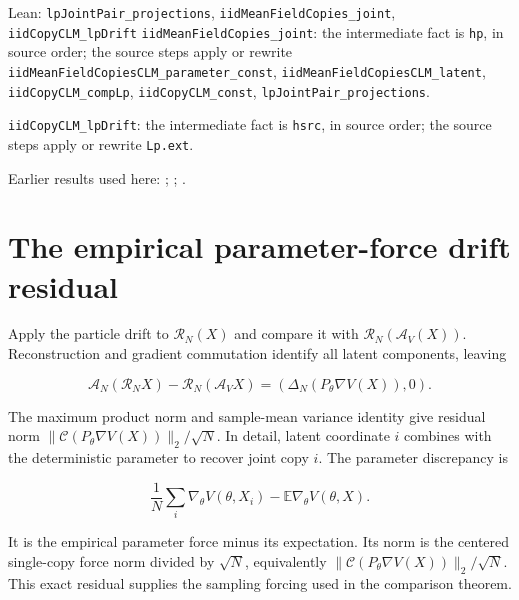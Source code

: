 \documentclass[11pt,a4paper]{article}
\begin{document}
\begin{leanbox}{Lean: \texttt{lpJointPair\_\allowbreak{}projections}, \texttt{iidMeanFieldCopies\_\allowbreak{}joint}, \texttt{iidCopyCLM\_\allowbreak{}lpDrift}}
\texttt{iid\allowbreak{}Mean\allowbreak{}Field\allowbreak{}Copies\_\allowbreak{}joint}: the intermediate fact is \texttt{hp}, in source order; the source steps apply or rewrite \texttt{iid\allowbreak{}Mean\allowbreak{}Field\allowbreak{}Copies\allowbreak{}CLM\_\allowbreak{}parameter\_\allowbreak{}const}, \texttt{iid\allowbreak{}Mean\allowbreak{}Field\allowbreak{}Copies\allowbreak{}CLM\_\allowbreak{}latent}, \texttt{iid\allowbreak{}Copy\allowbreak{}CLM\_\allowbreak{}comp\allowbreak{}Lp}, \texttt{iid\allowbreak{}Copy\allowbreak{}CLM\_\allowbreak{}const}, \texttt{lp\allowbreak{}Joint\allowbreak{}Pair\_\allowbreak{}projections}.



\texttt{iid\allowbreak{}Copy\allowbreak{}CLM\_\allowbreak{}lp\allowbreak{}Drift}: the intermediate fact is \texttt{hsrc}, in source order; the source steps apply or rewrite \texttt{Lp.\allowbreak{}ext}.
\end{leanbox}


Earlier results used here: \cite[Section~3.13.2]{LangevinLean2026ULASC}; \cite[Section~3.13.3]{LangevinLean2026ULASC}; \cite[Section~3.1.1]{LangevinLean2026IPLA}.

\section{\texorpdfstring{The empirical parameter-force drift residual}{The empirical parameter-force drift residual}}


Apply the particle drift to \(\mathcal R_N(X)\) and compare it with \(\mathcal R_N(\mathcal A_V(X))\). Reconstruction and gradient commutation identify all latent components, leaving

\[\mathcal A_N(\mathcal R_NX)-\mathcal R_N(\mathcal A_VX)=\left(\Delta_N(P_\theta\nabla V(X)),0\right).\]

The maximum product norm and sample-mean variance identity give residual norm \(\|\mathcal C(P_\theta\nabla V(X))\|_2/\sqrt N\). In detail, latent coordinate \(i\) combines with the deterministic parameter to recover joint copy \(i\). The parameter discrepancy is

\[\frac1N\sum_i\nabla_\theta V(\theta,X_i)-\mathbb E\nabla_\theta V(\theta,X).\]

It is the empirical parameter force minus its expectation. Its norm is the centered single-copy force norm divided by \(\sqrt N\), equivalently \(\|\mathcal C(P_\theta\nabla V(X))\|_2/\sqrt N\). This exact residual supplies the sampling forcing used in the comparison theorem.
\end{document}
